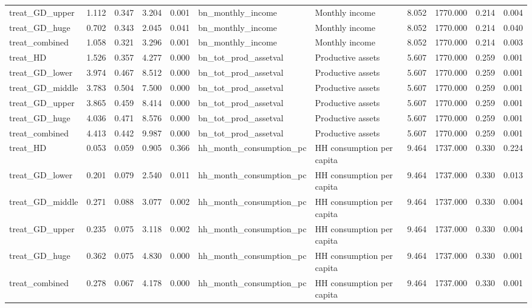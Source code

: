 \begin{tabular}{lllllllllll}
treat\_GD\_upper & 1.112 & 0.347 & 3.204 & 0.001 & bn\_monthly\_income & Monthly income & 8.052 & 1770.000 & 0.214 & 0.004 \\
treat\_GD\_huge & 0.702 & 0.343 & 2.045 & 0.041 & bn\_monthly\_income & Monthly income & 8.052 & 1770.000 & 0.214 & 0.040 \\
treat\_combined & 1.058 & 0.321 & 3.296 & 0.001 & bn\_monthly\_income & Monthly income & 8.052 & 1770.000 & 0.214 & 0.003 \\
treat\_HD & 1.526 & 0.357 & 4.277 & 0.000 & bn\_tot\_prod\_assetval & Productive assets & 5.607 & 1770.000 & 0.259 & 0.001 \\
treat\_GD\_lower & 3.974 & 0.467 & 8.512 & 0.000 & bn\_tot\_prod\_assetval & Productive assets & 5.607 & 1770.000 & 0.259 & 0.001 \\
treat\_GD\_middle & 3.783 & 0.504 & 7.500 & 0.000 & bn\_tot\_prod\_assetval & Productive assets & 5.607 & 1770.000 & 0.259 & 0.001 \\
treat\_GD\_upper & 3.865 & 0.459 & 8.414 & 0.000 & bn\_tot\_prod\_assetval & Productive assets & 5.607 & 1770.000 & 0.259 & 0.001 \\
treat\_GD\_huge & 4.036 & 0.471 & 8.576 & 0.000 & bn\_tot\_prod\_assetval & Productive assets & 5.607 & 1770.000 & 0.259 & 0.001 \\
treat\_combined & 4.413 & 0.442 & 9.987 & 0.000 & bn\_tot\_prod\_assetval & Productive assets & 5.607 & 1770.000 & 0.259 & 0.001 \\
treat\_HD & 0.053 & 0.059 & 0.905 & 0.366 & hh\_month\_consumption\_pc & HH consumption per capita & 9.464 & 1737.000 & 0.330 & 0.224 \\
treat\_GD\_lower & 0.201 & 0.079 & 2.540 & 0.011 & hh\_month\_consumption\_pc & HH consumption per capita & 9.464 & 1737.000 & 0.330 & 0.013 \\
treat\_GD\_middle & 0.271 & 0.088 & 3.077 & 0.002 & hh\_month\_consumption\_pc & HH consumption per capita & 9.464 & 1737.000 & 0.330 & 0.004 \\
treat\_GD\_upper & 0.235 & 0.075 & 3.118 & 0.002 & hh\_month\_consumption\_pc & HH consumption per capita & 9.464 & 1737.000 & 0.330 & 0.004 \\
treat\_GD\_huge & 0.362 & 0.075 & 4.830 & 0.000 & hh\_month\_consumption\_pc & HH consumption per capita & 9.464 & 1737.000 & 0.330 & 0.001 \\
treat\_combined & 0.278 & 0.067 & 4.178 & 0.000 & hh\_month\_consumption\_pc & HH consumption per capita & 9.464 & 1737.000 & 0.330 & 0.001 \\
\bottomrule
\end{tabular}
